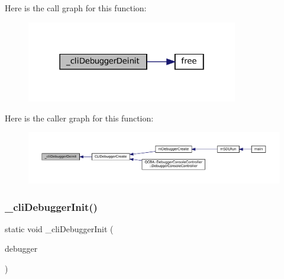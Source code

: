 Here is the call graph for this function\+:
\nopagebreak
\begin{figure}[H]
\begin{center}
\leavevmode
\includegraphics[width=262pt]{debugger_2cli-debugger_8c_a3c33653a15d0b7731137bd69b02ce538_cgraph}
\end{center}
\end{figure}
Here is the caller graph for this function\+:
\nopagebreak
\begin{figure}[H]
\begin{center}
\leavevmode
\includegraphics[width=350pt]{debugger_2cli-debugger_8c_a3c33653a15d0b7731137bd69b02ce538_icgraph}
\end{center}
\end{figure}
\mbox{\label{debugger_2cli-debugger_8c_a8fc8c3e7e849f47910d638e282575262}} 
\subsubsection{\texorpdfstring{\+\_\+cli\+Debugger\+Init()}{\_cliDebuggerInit()}}
{\footnotesize\ttfamily static void \+\_\+cli\+Debugger\+Init (\begin{DoxyParamCaption}\item[{struct m\+Debugger $\ast$}]{debugger }\end{DoxyParamCaption})\hspace{0.3cm}{\ttfamily [static]}}

